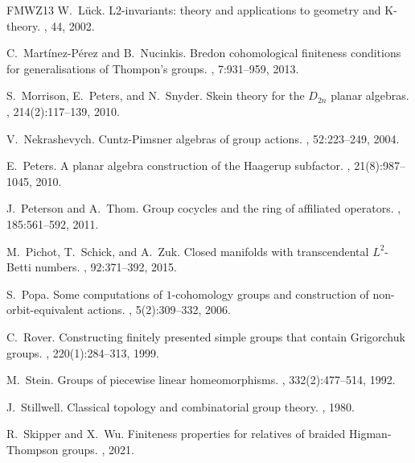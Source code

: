 \documentclass[a4paper, 12pt]{amsart}
\numberwithin{equation}{section}
\theoremstyle{definition}
\begin{document}
\begin{thebibliography}{FMWZ13}
W.~L\"uck.
\newblock L2-invariants: theory and applications to geometry and K-theory.
, 44, 2002.

C.~Mart\'inez-P\'erez and B.~Nucinkis.
\newblock Bredon cohomological finiteness conditions for generalisations of {T}hompon's groups.
, 7:931--959, 2013.

S.~Morrison, E.~Peters, and N.~Snyder.
\newblock Skein theory for the ${D}_{2n}$ planar algebras.
, 214(2):117--139, 2010.

V.~Nekrashevych.
\newblock Cuntz-{P}imsner algebras of group actions.
, 52:223--249, 2004.

E.~Peters.
\newblock A planar algebra construction of the {H}aagerup subfactor.
, 21(8):987--1045, 2010.

J.~Peterson and A.~Thom.
\newblock Group cocycles and the ring of affiliated operators.
, 185:561--592, 2011.

M.~Pichot, T.~Schick, and A.~Zuk.
\newblock Closed manifolds with transcendental ${L}^2$-{B}etti numbers.
, 92:371--392, 2015.

S.~Popa.
\newblock Some computations of $1$-cohomology groups and construction of non-orbit-equivalent actions.
, 5(2):309--332, 2006.

C.~Rover.
\newblock Constructing finitely presented simple groups that contain
  {G}rigorchuk groups.
, 220(1):284--313, 1999.

M.~Stein.
\newblock Groups of piecewise linear homeomorphisms.
, 332(2):477--514, 1992.

J.~Stillwell.
\newblock Classical topology and combinatorial group theory.
, 1980.

R.~Skipper and X.~Wu.
\newblock Finiteness properties for relatives of braided {H}igman-{T}hompson
  groups.
, 2021.


\end{thebibliography}
\end{document}
